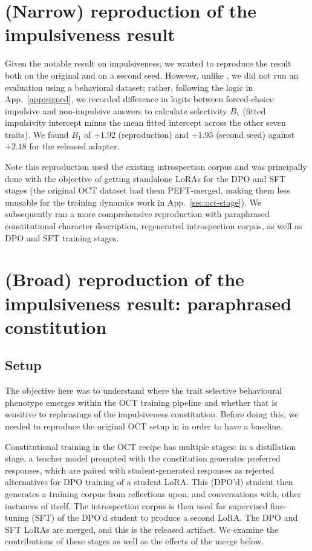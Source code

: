 \documentclass[11pt]{article}
\begin{document}
\section{(Narrow) reproduction of the impulsiveness result}
\label{app:impulsive-repro}

Given the notable result on impulsiveness, we wanted to reproduce the result both on the original and on a second seed. However, unlike \citet{maiya2025opencharactertrainingshaping}, we did not run an evaluation using a behavioral dataset; rather, following the logic in App.~\ref{app:signed}, we recorded difference in logits between forced-choice impulsive and non-impulsive answers to calculate selectivity $B_1$ (fitted impulsivity intercept minus the mean fitted intercept across the other seven traits). We found $B_1$ of $+1.92$ (reproduction) and $+1.95$ (second seed) against $+2.18$ for the \citet{maiya2025opencharactertrainingshaping} released adapter. 

Note this reproduction used the existing introspection corpus and was principally done with the objective of getting standalone LoRAs for the DPO and SFT stages (the original OCT dataset had them PEFT-merged, making them less unusable for the training dynamics work in App.~\ref{sec:oct-stage}). We subsequently ran a more comprehensive reproduction with paraphrased constitutional character description, regenerated introspection corpus, as well as DPO and SFT training stages.

\section{(Broad) reproduction of the impulsiveness result: paraphrased constitution}
\label{app:impulsive-paraphrase}

\subsection{Setup}

The objective here was to understand where the trait selective behavioural phenotype emerges within the OCT training pipeline and whether that is sensitive to rephrasings of the impulsiveness constitution. Before doing this, we needed to reproduce the original OCT setup in \citep{maiya2025opencharactertrainingshaping} in order to have a baseline.

Constitutional training in the OCT recipe \citep{maiya2025opencharactertrainingshaping} has multiple stages: in a distillation stage, a teacher model prompted with the constitution generates preferred responses, which are paired with student-generated responses as rejected alternatives for DPO training of a student LoRA. This (DPO'd) student then generates a training corpus from reflections upon, and conversations with, other instances of itself. The introspection corpus is then used for supervised fine-tuning (SFT) of the DPO'd student to produce a second LoRA. The DPO and SFT LoRAs are merged, and this is the released artifact. We examine the contributions of these stages as well as the effects of the merge below.
\end{document}
